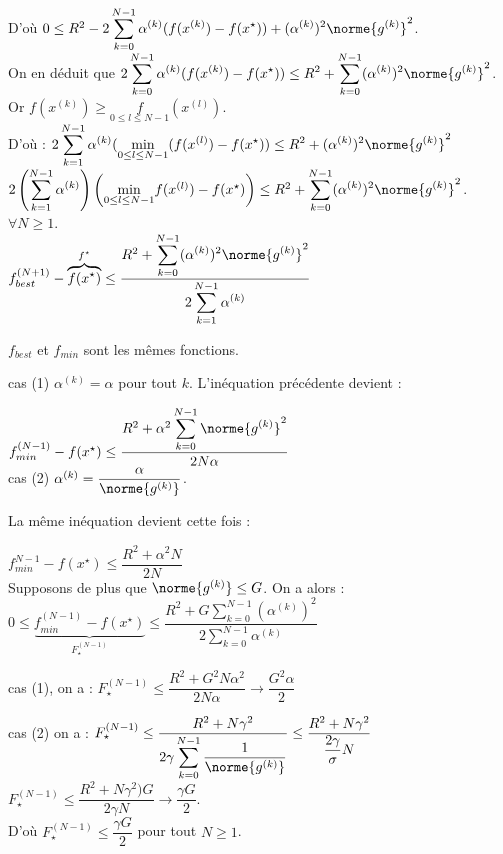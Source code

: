 \documentclass[12pt,a4paper]{article}
\begin{document}
	D'où $0 \leq R^2 - 2 \displaystyle\sum_{k=0}^{N-1} \alpha^{(k)} (f(x^{(k)})-f(x^\star)) + (\alpha^{(k)})^2\norme{g^{(k)}}^2$.\\
	On en déduit que $2\displaystyle\sum_{k=0}^{N-1} \alpha^{(k)}(f(x^{(k)})-f(x^\star)) \leq R^2 + \sum_{k=0}^{N-1} (\alpha^{(k)})^2\norme{g^{(k)}}^2$.\\
	Or $f(x^{(k)}) \geq \underset{0\leq l \leq N-1} f(x^{(l)})$.\\
	D'où :
	$2\displaystyle\sum_{k=1}^{N-1} \alpha^{(k)}(\underset{0\leq l\leq N-1}\min (f(x^{(l)})-f(x^\star)) \leq R^2 + (\alpha^{(k)})^2\norme{g^{(k)}}^2$\\
	$2\left(\displaystyle\sum_{k=1}^{N-1} \alpha^{(k)}\right)\left(\underset{0\leq l \leq N-1}\min f(x^{(l)})-f(x^\star)\right) \leq R^2 + \displaystyle\sum_{k=0}^{N-1} (\alpha^{(k)})^2 \norme{g^{(k)}}^2$.\\
	$\forall N \geq 1$.\\
	$f_{best}^{(N+1)} - \overbrace{f(x^{\star})}^{f^\star} \leq \dfrac{R^2 + \displaystyle\sum_{k=0}^{N-1} (\alpha^{(k)})^2\norme{g^{(k)}}^2}{2\displaystyle\sum_{k=1}^{N-1} \alpha^{(k)}}$
	
	\begin{rmq}
		$f_{best}$ et $f_{min}$ sont les mêmes fonctions.
	\end{rmq}
	
	cas (1) $\alpha^{(k)}=\alpha$ pour tout $k$. L'inéquation précédente devient :
	
	$f_ {min}^{(N-1)} - f(x^\star) \leq \dfrac{R^2 + \alpha^2\displaystyle\sum_{k=0}^{N-1} \norme{g^{(k)}}^2}{2N\alpha}$\\
	
	cas (2) $\alpha^{(k)} = \dfrac{\alpha}{\norme{g^{(k)}}}$.
	
	La même inéquation devient cette fois :
	
	$f_ {min}^{N-1} - f(x^\star) \leq \dfrac{R^2+\alpha^2 N}{2N}$\\
	Supposons de plus que $\norme{g^{(k)}} \leq G$. On a alors : 
	$0 \leq \underbrace{f_ {min}^{(N-1)} - f(x^\star)}_{F_\star^{(N-1)}} \leq \dfrac{R^2 + G\displaystyle\sum_{k=0}^{N-1} (\alpha^{(k)})^2}{2\displaystyle\sum_{k=0}^{N-1}\alpha^{(k)}}$
	
	cas (1), on a :
	$F_ {\star}^{(N-1)} \leq \dfrac{R^2 + G^2 N \alpha^2}{2N \alpha} \to \dfrac{G^2\alpha}{2}$
	
	cas (2) on a :
	$F_ \star^{(N-1)} \leq \dfrac{R^2 + N\gamma^2}{2\gamma\displaystyle\sum_{k=0}^{N-1} \dfrac1{\norme{g^{(k)}}}} \leq \dfrac{R^2+N\gamma^2}{\dfrac{2\gamma}\sigma N}$\\
	$F_ \star^{(N-1)} \leq \dfrac{R^2 + N\gamma^2)G}{2\gamma N} \to \dfrac{\gamma G}2$.\\
	D'où $F_ {\star}^{(N-1)} \leq \dfrac{\gamma G}2$ pour tout $N \geq 1$.\\
	
\end{document}
